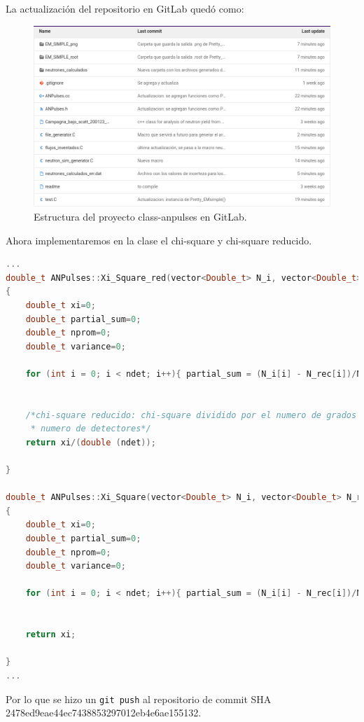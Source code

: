 \documentclass[11pt,letterpaper]{article}
\begin{document}
La actualización del repositorio en GitLab quedó como:

\begin{figure}[H]
    \includegraphics[width=1\textwidth]{img/Screenshot from 2021-12-02 03-42-56.png}
    \centering
    \caption{Estructura del proyecto class-anpulses  en GitLab.}
\end{figure}

Ahora implementaremos en la clase el chi-square y chi-square reducido. 

\begin{lstlisting}[language=C++]
...
double_t ANPulses::Xi_Square_red(vector<Double_t> N_i, vector<Double_t> N_rec, vector<Double_t> Err, double ndet)
{
	double_t xi=0;
	double_t partial_sum=0;
	double_t nprom=0;
	double_t variance=0;

	for (int i = 0; i < ndet; i++){ partial_sum = (N_i[i] - N_rec[i])/N_i[i]; xi += partial_sum*partial_sum; }


	/*chi-square reducido: chi-square dividido por el numero de grados de libertad (ndl) del problema, en esta caso el 
	 * numero de detectores*/
	return xi/(double (ndet));
	
}

double_t ANPulses::Xi_Square(vector<Double_t> N_i, vector<Double_t> N_rec, vector<Double_t> Err, double ndet)
{
	double_t xi=0;
	double_t partial_sum=0;
	double_t nprom=0;
	double_t variance=0;

	for (int i = 0; i < ndet; i++){ partial_sum = (N_i[i] - N_rec[i])/N_i[i]; xi += partial_sum*partial_sum; }


	return xi;
	
}
...
\end{lstlisting}

Por lo que se hizo un \verb|git push| al repositorio de commit SHA 2478ed9eae44ec7438853297012eb4e6ae155132.
\end{document}
